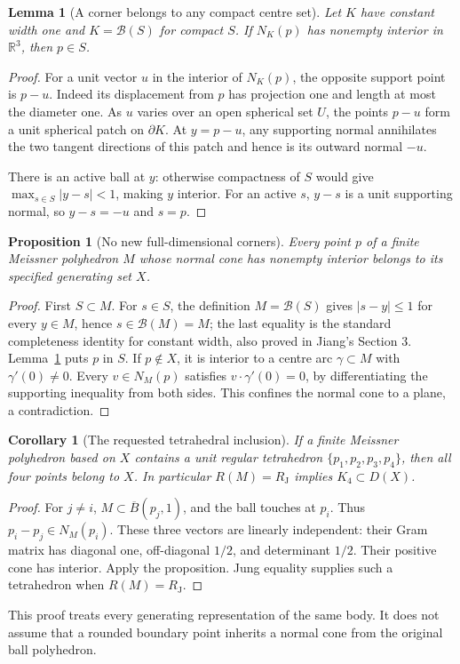 \documentclass[11pt]{article}
\newtheorem{lemma}[theorem]{Lemma}
\newtheorem{proposition}[theorem]{Proposition}
\newtheorem{corollary}[theorem]{Corollary}
\theoremstyle{remark}\newtheorem{remark}[theorem]{Remark}
\newcommand{\R}{\mathbb R}
\newcommand{\RJ}{R_{\mathrm J}}
\newcommand{\B}{\mathcal B}
\begin{document}
\begin{lemma}[A corner belongs to any compact centre set]\label{jiang:corner}
Let $K$ have constant width one and $K=\B(S)$ for compact $S$.
If $N_K(p)$ has nonempty interior in $\R^3$, then $p\in S$.
\end{lemma}
\begin{proof}
For a unit vector $u$ in the interior of $N_K(p)$, the opposite support
point is $p-u$. Indeed its displacement from $p$ has projection one and
length at most the diameter one. As $u$ varies over an open spherical set
$U$, the points $p-u$ form a unit spherical patch on $\partial K$.
At $y=p-u$, any supporting normal annihilates the two tangent directions
of this patch and hence is its outward normal $-u$.

There is an active ball at $y$: otherwise compactness of $S$ would give
$\max_{s\in S}|y-s|<1$, making $y$ interior. For an active $s$,
$y-s$ is a unit supporting normal, so $y-s=-u$ and $s=p$.
\end{proof}

\begin{proposition}[No new full-dimensional corners]
Every point $p$ of a finite Meissner polyhedron $M$ whose normal cone has
nonempty interior belongs to its specified generating set $X$.
\end{proposition}
\begin{proof}
First $S\subset M$. For $s\in S$, the definition $M=\B(S)$ gives
$|s-y|\leq1$ for every $y\in M$, hence $s\in\B(M)=M$; the last equality
is the standard completeness identity for constant width, also proved in
Jiang's Section 3. Lemma~\ref{jiang:corner} puts $p$ in $S$. If $p\notin X$,
it is interior to a centre arc $\gamma\subset M$ with $\gamma'(0)\ne0$.
Every $v\in N_M(p)$ satisfies $v\cdot\gamma'(0)=0$, by differentiating
the supporting inequality from both sides. This confines the normal cone
to a plane, a contradiction.
\end{proof}

\begin{corollary}[The requested tetrahedral inclusion]\label{jiang:tetra}
If a finite Meissner polyhedron based on $X$ contains a unit regular
tetrahedron $\{p_1,p_2,p_3,p_4\}$, then all four points belong to $X$.
In particular $R(M)=\RJ$ implies $K_4\subset D(X)$.
\end{corollary}
\begin{proof}
For $j\ne i$, $M\subset\overline B(p_j,1)$, and the ball touches at $p_i$.
Thus $p_i-p_j\in N_M(p_i)$. These three vectors are linearly independent:
their Gram matrix has diagonal one, off-diagonal $1/2$, and determinant
$1/2$. Their positive cone has interior. Apply the proposition.
Jung equality supplies such a tetrahedron when $R(M)=\RJ$.
\end{proof}
This proof treats every generating representation of the same body.
It does not assume that a rounded boundary point inherits a normal cone
from the original ball polyhedron.
\end{document}
